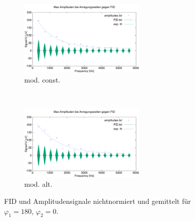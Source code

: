 \documentclass{article}
\begin{document}
        \begin{figure}[h]
            \centering
            \begin{subfigure}[b]{0.4\textwidth}
                \centering
                \includegraphics[width=6cm]{../Bilddateien/CPMG-180-0-constant-avg.png}
                \caption{mod. const.}
                \label{fig:CPMG-180-0-constant-avg}
            \end{subfigure}
            \
            \begin{subfigure}[b]{0.4\textwidth}
                \centering
                \includegraphics[width=6cm]{../Bilddateien/CPMG-180-0-alternating-avg.png}
                \caption{mod. alt.}
                \label{fig:CPMG-180-0-alternating-avg}
            \end{subfigure}
            \caption{FID und Amplitudensignale nichtnormiert und gemittelt für $\varphi_1 = 180$, $\varphi_2 = 0$.}
            \label{fig:CPMG-180-0-avg}
        \end{figure}
\end{document}
